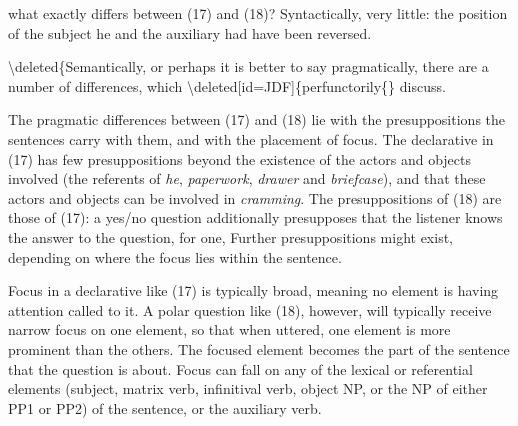 \documentclass[12pt,oneside]{book}
\begin{document}
 what exactly differs between (17) and (18)? Syntactically, very little: the position of the subject he and the auxiliary had have been reversed.

\textbackslash{}deleted\{Semantically, or perhaps it is better to say pragmatically, there are a number of differences, which  \textbackslash{}deleted{[}id=JDF{]}\{perfunctorily\{\} discuss. 

The  pragmatic\added{,} differences between (17) and (18) lie with the presuppositions the sentences carry with them, and with the placement of focus. The declarative in (17) has few presuppositions beyond the existence of the actors and objects involved (the referents of \emph{he}, \emph{paperwork}, \emph{drawer} and \emph{briefcase}), and that these actors and objects can be involved in \emph{cramming}. The presuppositions of (18) are  those of (17): a yes/no question additionally presupposes that the listener knows the answer to the question, for one,  Further presuppositions might exist, depending on where the focus lies within the sentence.

Focus in a declarative like (17) is typically broad, meaning no element is having attention called to it. A polar question like (18), however, will typically receive narrow focus on one element, so that when uttered, one element is more prominent than the others. The focused element becomes the part of the sentence that the question is about. Focus can fall on any of the lexical or referential elements (subject, matrix verb, infinitival verb, object NP, or the NP of either PP1 or PP2) of the sentence, or the auxiliary verb. 
\end{document}
